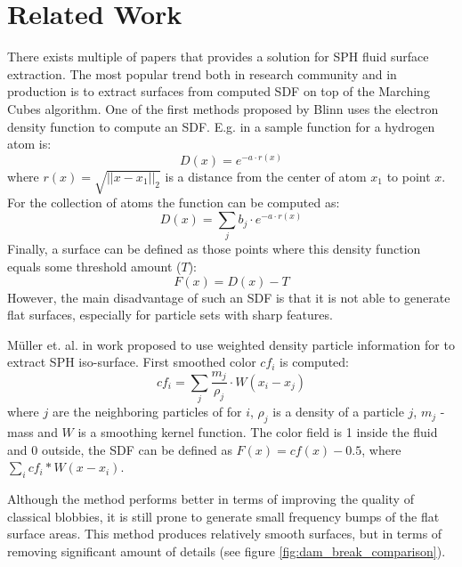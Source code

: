 \chapter{Related Work}\label{sec:related-work}
There exists multiple of papers that provides a solution for SPH fluid surface extraction. The most popular trend  both in research community and in production is to extract surfaces from computed SDF on top of the Marching Cubes algorithm. One of the first methods proposed by Blinn uses the electron density function to compute an SDF. E.g. in \cite{Blinn} a sample function for a  hydrogen atom is:
\begin{equation}
	D(x) = e^{-a\cdot r(x)}
\end{equation}
where $r(x) = \sqrt{||x - x_1||_2}$ is a distance from the center of atom $x_1$ to point $x$. For the collection of atoms the function can be computed as:
\begin{equation}
	D(x) = \sum_j{b_j\cdot e^{-a\cdot r(x)}}
\end{equation}
Finally, a surface can be defined as those points where this density function equals some threshold amount ($T$):
\begin{equation}
	F(x) = D(x) - T
\end{equation}
However, the main disadvantage of such an SDF is that it is not able to generate flat surfaces, especially for particle sets with sharp features.

Müller et. al. in work \cite{Muller} proposed to use weighted density particle information for to extract SPH iso-surface. First smoothed color $cf_i$ is computed:
\begin{equation}
	cf_i = \sum_j{\dfrac{m_j}{\rho_j} \cdot W(x_i - x_j)}
\end{equation}
where $j$ are the neighboring particles of for $i$, $\rho_j$ is a density of a particle $j$, $m_j$ - mass and $W$ is a smoothing kernel function. The color field is 1 inside the fluid and 0 outside, the SDF can be defined as $F(x) = cf(x) - 0.5$, where $\sum_i cf_i * W(x - x_i)$.

Although the method performs better in terms of improving the quality of classical blobbies, it is still prone to generate small frequency bumps of the flat surface areas. This method produces relatively smooth surfaces, but in terms of removing significant amount of details (see figure \ref{fig:dam_break_comparison}).

